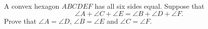 A convex hexagon $ABCDEF$ has all six sides equal. Suppose that
\[
\angle A+\angle C+\angle E=\angle B+\angle D+\angle F.
\]
Prove that $\angle A=\angle D$, $\angle B=\angle E$ and $\angle C=\angle F$.
